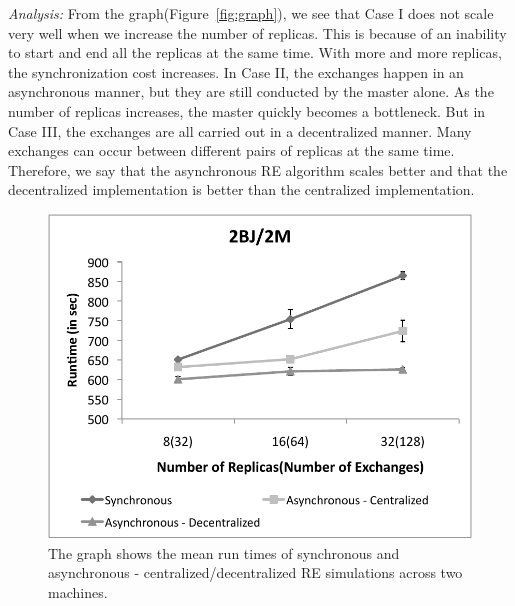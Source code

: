 \documentclass[a4paper,10pt]{article}
\begin{document}
{\it Analysis: } From the graph(Figure~\ref{fig:graph}), we see that
Case I does not scale very well when we increase the number of
replicas. This is because of an inability to start and end all the
replicas at the same time. With more and more replicas, the
synchronization cost increases.  In Case II, the exchanges happen in
an asynchronous manner, but they are still conducted by the master
alone. As the number of replicas increases, the master quickly becomes
a bottleneck. But in Case III, the exchanges are all carried out in a
decentralized manner. Many exchanges can occur between different pairs
of replicas at the same time. Therefore, we say that the asynchronous
RE algorithm scales better and that the decentralized implementation
is better than the centralized implementation.

%
\begin{figure}
\centering
\includegraphics[scale=0.80]{data/2Machines.pdf}
\caption{\small The graph shows the mean run times of synchronous and asynchronous - centralized/decentralized RE simulations across two machines.}
\label{fig:2machines}
\vspace{-1em}
\end{figure}
\end{document}
